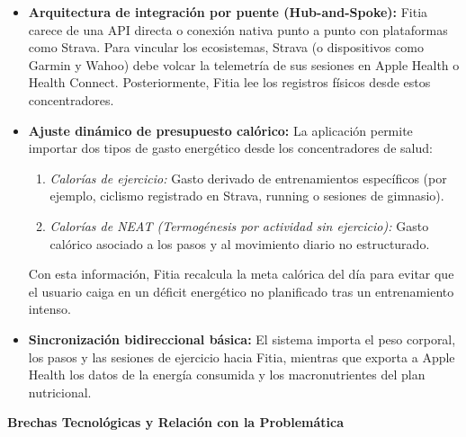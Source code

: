 \documentclass[12pt]{article}
\begin{document}
\begin{itemize}
    \item \textbf{Arquitectura de integración por puente (Hub-and-Spoke):} Fitia carece de una API directa o conexión nativa punto a punto con plataformas como Strava. Para vincular los ecosistemas, Strava (o dispositivos como Garmin y Wahoo) debe volcar la telemetría de sus sesiones en Apple Health o Health Connect. Posteriormente, Fitia lee los registros físicos desde estos concentradores.
    \item \textbf{Ajuste dinámico de presupuesto calórico:} La aplicación permite importar dos tipos de gasto energético desde los concentradores de salud:
    \begin{enumerate}
        \item \textit{Calorías de ejercicio:} Gasto derivado de entrenamientos específicos (por ejemplo, ciclismo registrado en Strava, running o sesiones de gimnasio).
        \item \textit{Calorías de NEAT (Termogénesis por actividad sin ejercicio):} Gasto calórico asociado a los pasos y al movimiento diario no estructurado.
    \end{enumerate}
    Con esta información, Fitia recalcula la meta calórica del día para evitar que el usuario caiga en un déficit energético no planificado tras un entrenamiento intenso.
    \item \textbf{Sincronización bidireccional básica:} El sistema importa el peso corporal, los pasos y las sesiones de ejercicio hacia Fitia, mientras que exporta a Apple Health los datos de la energía consumida y los macronutrientes del plan nutricional.
\end{itemize}

\textbf{Brechas Tecnológicas y Relación con la Problemática}
\end{document}
